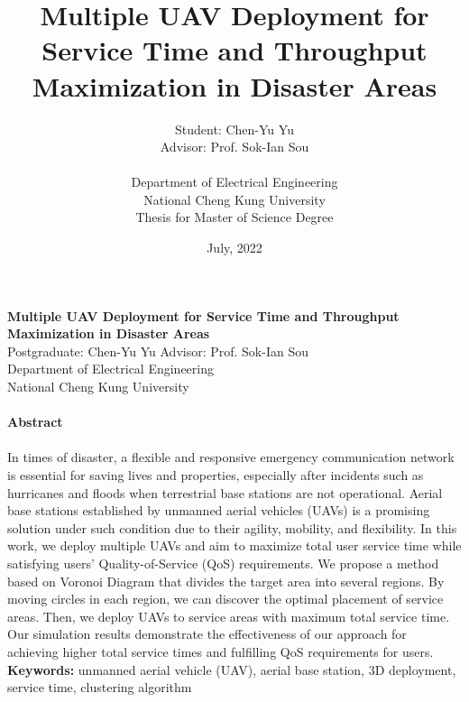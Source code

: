 \documentclass[a4paper,12pt]{report}
\title{Multiple UAV Deployment for Service Time and Throughput Maximization in Disaster Areas\\}
\author{Student: Chen-Yu Yu \\
Advisor: Prof. Sok-Ian Sou\\
\\
Department of Electrical Engineering  \\
National Cheng Kung University \\
Thesis for Master of Science Degree \\
}
\date{July, 2022}
\begin{document}

\maketitle

\begin{titlepage}
    \begin{center}
        {\bf\large Multiple UAV Deployment for Service Time and Throughput Maximization in Disaster Areas}\\
        {Postgraduate: Chen-Yu Yu \hspace{8mm} Advisor: Prof. Sok-Ian Sou}\\
        {Department of Electrical Engineering}\\
        {National Cheng Kung University}\\
    \end{center}

    \paragraph{}
    \begin{center}
        {\bf Abstract}\\
    \end{center}
    \paragraph{}
    In times of disaster, a flexible and responsive emergency communication network is essential for saving lives and properties, especially after incidents such as hurricanes and floods when terrestrial base stations are not operational. Aerial base stations established by unmanned aerial vehicles (UAVs) is a promising solution under such condition due to their agility, mobility, and flexibility. In this work, we deploy multiple UAVs and aim to maximize total user service time while satisfying users' Quality-of-Service (QoS) requirements. We propose a method based on Voronoi Diagram that divides the target area into several regions. By moving circles in each region, we can discover the optimal placement of service areas. Then, we deploy UAVs to service areas with maximum total service time. Our simulation results demonstrate the effectiveness of our approach for achieving higher total service times and fulfilling QoS requirements for users.\\
    
    \textbf{Keywords:} {unmanned aerial vehicle (UAV), aerial base station, 3D deployment, service time, clustering algorithm}
\end{titlepage}
\end{document}

